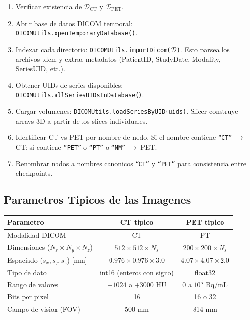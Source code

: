 \documentclass[12pt,a4paper]{article}
\begin{document}
\begin{enumerate}
    \item Verificar existencia de $\mathcal{D}_{\text{CT}}$ y $\mathcal{D}_{\text{PET}}$.
    \item Abrir base de datos DICOM temporal:
          \texttt{DICOMUtils.openTemporaryDatabase()}.
    \item Indexar cada directorio:
          \texttt{DICOMUtils.importDicom($\mathcal{D}$)}.
          Esto parsea los archivos .dcm y extrae metadatos (PatientID,
          StudyDate, Modality, SeriesUID, etc.).
    \item Obtener UIDs de series disponibles:
          \texttt{DICOMUtils.allSeriesUIDsInDatabase()}.
    \item Cargar volumenes:
          \texttt{DICOMUtils.loadSeriesByUID(uids)}.
          Slicer construye arrays 3D a partir de los slices individuales.
    \item Identificar CT vs PET por nombre de nodo.
          Si el nombre contiene \texttt{``CT''} $\to$ CT;
          si contiene \texttt{``PET''} o \texttt{``PT''} o \texttt{``NM''} $\to$ PET.
    \item Renombrar nodos a nombres canonicos \texttt{``CT''} y \texttt{``PET''}
          para consistencia entre checkpoints.
\end{enumerate}

\subsection{Parametros Tipicos de las Imagenes}

\begin{table}[H]
\centering
\begin{tabular}{l c c}
\toprule
\textbf{Parametro} & \textbf{CT tipico} & \textbf{PET tipico} \\
\midrule
Modalidad DICOM & CT & PT \\
Dimensiones ($N_x \times N_y \times N_z$) & $512 \times 512 \times N_s$ & $200 \times 200 \times N_s$ \\
Espaciado ($s_x, s_y, s_z$) [mm] & $0.976 \times 0.976 \times 3.0$ & $4.07 \times 4.07 \times 2.0$ \\
Tipo de dato & int16 (enteros con signo) & float32 \\
Rango de valores & $-1024$ a $+3000$ HU & $0$ a $10^5$ Bq/mL \\
Bits por pixel & 16 & 16 o 32 \\
Campo de vision (FOV) & 500 mm & 814 mm \\
\bottomrule
\end{tabular}
\end{table}
\end{document}
